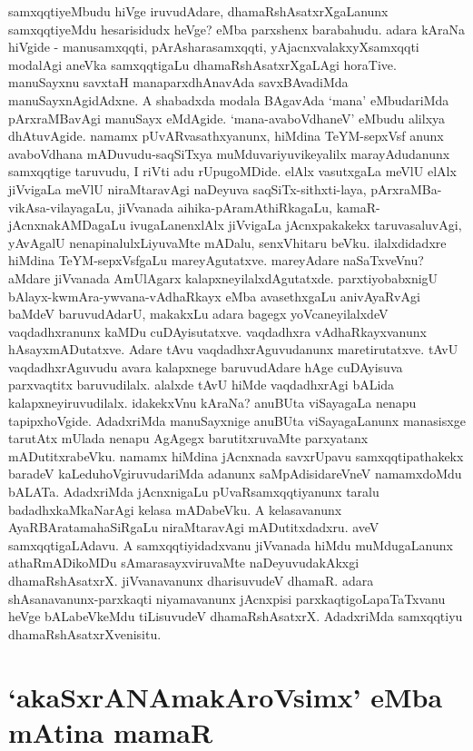 samxqqtiyeMbudu hiVge iruvudAdare, dhamaRshAsatxrXgaLanunx samxqqtiyeMdu hesarisidudx heVge? eMba parxshenx barabahudu. adara kAraNa hiVgide - manusamxqqti, pArAsharasamxqqti, yAjacnxvalakxyXsamxqqti modalAgi aneVka samxqqtigaLu dhamaRshAsatxrXgaLAgi horaTive. manuSayxnu savxtaH manaparxdhAnavAda savxBAvadiMda manuSayxnAgidAdxne. A shabadxda modala BAgavAda `mana' eMbudariMda pArxraMBavAgi manuSayx eMdAgide. `mana-avaboVdhaneV' eMbudu alilxya dhAtuvAgide. namamx pUvARvasathxyanunx, hiMdina TeYM-sepxVsf anunx avaboVdhana mADuvudu-saqSiTxya muMduvariyuvikeyalilx marayAdudanunx samxqqtige taruvudu, I riVti adu rUpugoMDide. elAlx vasutxgaLa meVlU elAlx jiVvigaLa meVlU niraMtaravAgi naDeyuva saqSiTx-sithxti-laya, pArxraMBa-vikAsa-vilayagaLu, jiVvanada aihika-pAramAthiRkagaLu, kamaR-jAcnxnakAMDagaLu ivugaLanenxlAlx jiVvigaLa jAcnxpakakekx taruvasaluvAgi, yAvAgalU nenapinalulxLiyuvaMte mADalu, senxVhitaru beVku. ilalxdidadxre hiMdina TeYM-sepxVsfgaLu mareyAgutatxve. mareyAdare naSaTxveVnu? aMdare jiVvanada AmUlAgarx kalapxneyilalxdAgutatxde. parxtiyobabxnigU bAlayx-kwmAra-ywvana-vAdhaRkayx eMba avasethxgaLu anivAyaRvAgi baMdeV baruvudAdarU, makakxLu adara bagegx yoVcaneyilalxdeV vaqdadhxranunx kaMDu cuDAyisutatxve. vaqdadhxra vAdhaRkayxvanunx hAsayxmADutatxve. Adare tAvu vaqdadhxrAguvudanunx maretirutatxve. tAvU vaqdadhxrAguvudu avara kalapxnege baruvudAdare hAge cuDAyisuva parxvaqtitx baruvudilalx. alalxde tAvU hiMde vaqdadhxrAgi bALida kalapxneyiruvudilalx. idakekxVnu kAraNa? anuBUta viSayagaLa nenapu tapipxhoVgide. AdadxriMda manuSayxnige anuBUta viSayagaLanunx manasisxge tarutAtx mUlada nenapu AgAgegx barutitxruvaMte parxyatanx mADutitxrabeVku. namamx hiMdina jAcnxnada savxrUpavu samxqqtipathakekx baradeV kaLeduhoVgiruvudariMda adanunx saMpAdisidareVneV namamxdoMdu bALATa. AdadxriMda jAcnxnigaLu pUvaRsamxqqtiyanunx taralu badadhxkaMkaNarAgi kelasa mADabeVku. A kelasavanunx AyaRBAratamahaSiRgaLu niraMtaravAgi mADutitxdadxru. aveV samxqqtigaLAdavu. A samxqqtiyidadxvanu jiVvanada hiMdu muMdugaLanunx athaRmADikoMDu sAmarasayxviruvaMte naDeyuvudakAkxgi dhamaRshAsatxrX. jiVvanavanunx dharisuvudeV dhamaR. adara shAsanavanunx-parxkaqti niyamavanunx jAcnxpisi parxkaqtigoLapaTaTxvanu heVge bALabeVkeMdu tiLisuvudeV dhamaRshAsatxrX. AdadxriMda samxqqtiyu dhamaRshAsatxrXvenisitu.

\section*{`akaSxrANAmakAroV\s simx' eMba mAtina mamaR}
\label{95}

